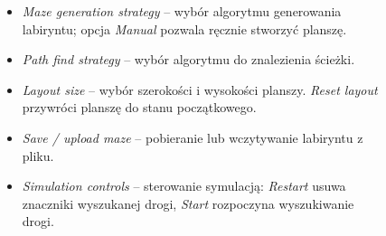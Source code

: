 \documentclass[../doc.tex]{subfiles}
\begin{document}
\begin{figure}[H]
\begin{minipage}[c]{0.6\textwidth}
\begin{itemize}
      \item \textit{Maze generation strategy} – wybór algorytmu generowania labiryntu; opcja \textit{Manual} pozwala ręcznie stworzyć planszę.

      \item \textit{Path find strategy} – wybór algorytmu do znalezienia ścieżki.

      \item \textit{Layout size} – wybór szerokości i wysokości planszy. \textit{Reset layout} przywróci planszę do stanu początkowego.

      \item \textit{Save / upload maze} – pobieranie lub wczytywanie labiryntu z pliku.

      \item \textit{Simulation controls} – sterowanie symulacją: \textit{Restart} usuwa znaczniki wyszukanej drogi, \textit{Start} rozpoczyna wyszukiwanie drogi.
    \end{itemize}
  \end{minipage}
\end{figure}
\end{document}
